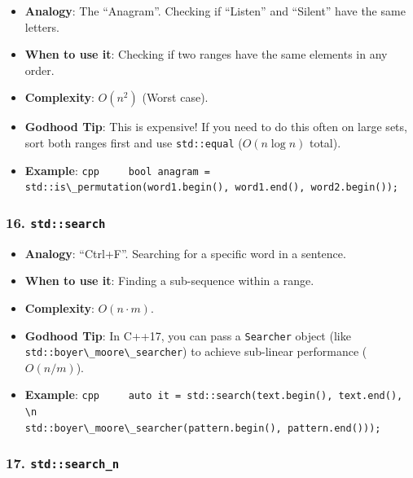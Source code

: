 \begin{itemize}
\tightlist
\item
  \textbf{Analogy}: The ``Anagram''. Checking if ``Listen'' and
  ``Silent'' have the same letters.
\item
  \textbf{When to use it}: Checking if two ranges have the same elements
  in any order.
\item
  \textbf{Complexity}: \(O(n^2)\) (Worst case).
\item
  \textbf{Godhood Tip}: This is expensive! If you need to do this often
  on large sets, sort both ranges first and use
  \passthrough{\lstinline!std::equal!} (\(O(n \log n)\) total).
\item
  \textbf{Example}:
  \passthrough{\lstinline!cpp     bool anagram = std::is\_permutation(word1.begin(), word1.end(), word2.begin());!}
\end{itemize}

\hypertarget{stdsearch}{%
\subsubsection{\texorpdfstring{16.
\texttt{std::search}}{16. std::search}}\label{stdsearch}}

\begin{itemize}
\tightlist
\item
  \textbf{Analogy}: ``Ctrl+F''. Searching for a specific word in a
  sentence.
\item
  \textbf{When to use it}: Finding a sub-sequence within a range.
\item
  \textbf{Complexity}: \(O(n \cdot m)\).
\item
  \textbf{Godhood Tip}: In C++17, you can pass a
  \passthrough{\lstinline!Searcher!} object (like
  \passthrough{\lstinline!std::boyer\_moore\_searcher!}) to achieve
  sub-linear performance (\(O(n/m)\)).
\item
  \textbf{Example}:
  \passthrough{\lstinline!cpp     auto it = std::search(text.begin(), text.end(), \\n                         std::boyer\_moore\_searcher(pattern.begin(), pattern.end()));!}
\end{itemize}

\hypertarget{stdsearch_n}{%
\subsubsection{\texorpdfstring{17.
\texttt{std::search\_n}}{17. std::search\_n}}\label{stdsearch_n}}

